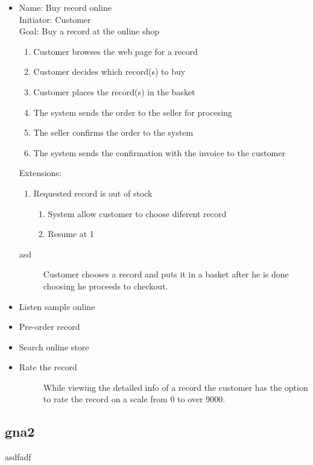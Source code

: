 \documentclass[12pt, titlepage]{article}
\begin{document}
\begin{itemize}
\item
    Name: Buy record online \\
    Initiator: Customer \\
    Goal: Buy a record at the online shop 
    \begin{enumerate}
    \item Customer browses the web page for a record
    \item Customer decides which record(s) to buy
    \item Customer places the record(s) in the basket
    \item The system sends the order to the seller for procesing
    \item The seller confirms the order to the system
    \item The system sends the confirmation with the invoice to the customer
    \end{enumerate}
    Extensions:
    \begin{enumerate}
    \item Requested record is out of stock
        \begin{enumerate}
        \item System allow customer to choose diferent record
        \item Resume at 1
        \end{enumerate}
    \end{enumerate}
    
    \begin{description}
    \item[asd]
   Customer chooses a record and puts it in a basket after he is done choosing he proceeds to checkout.
    \end{description}
\item
    Listen sample online
\item
    Pre-order record
\item 
    Search online store
\item 
    Rate the record
    \begin{description}
    \item[] While viewing the detailed info of a record the customer has the option to rate
    the record on a scale from 0 to over 9000.
    \end{description}
\end{itemize}
\subsection{gna2}
asdfadf
\end{document}
